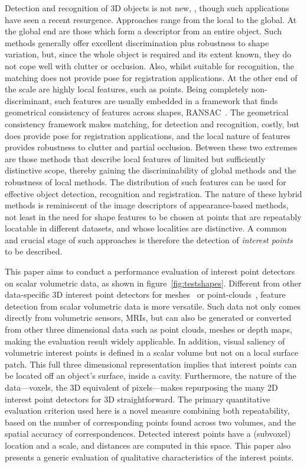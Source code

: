 Detection and recognition of 3D objects is not new, \eg \cite{Fisher1987}, though such applications have seen a recent resurgence. Approaches range from the local to the global. 
At the global end are those which form a descriptor from an entire object. Such methods generally offer excellent discrimination plus robustness to shape variation, but, since the whole object is required and its extent known, they do not cope well with clutter or occlusion. Also, whilst suitable for recognition, the matching does not provide pose for registration applications. At the other end of the scale are highly local features, such as points. Being completely non-discriminant, such features are usually embedded in a framework that finds geometrical consistency of features across shapes, \eg RANSAC~\cite{Brown2005,Papazov2011}. The geometrical consistency framework makes matching, for detection and recognition, costly, but does provide pose for registration applications, and the local nature of features provides robustness to clutter and partial occlusion. Between these two extremes are those methods that describe local features of limited but sufficiently distinctive scope, thereby gaining the discriminability of global methods and the robustness of local methods. The distribution of such features can be used for effective object detection, recognition and registration. The nature of these hybrid methods is reminiscent of the image descriptors of appearance-based methods, not least in the need for shape features to be chosen at points that are repeatably locatable in different datasets, and whose localities are distinctive. A common and crucial stage of such approaches is therefore the detection of \emph{interest points} to be described. 


This paper aims to conduct a performance evaluation of interest point detectors on scalar volumetric data, as shown in figure~\ref{fig:testshapes}. 
Different from other data-specific 3D interest point detectors for meshes~\cite{Sipiran2011,Glomb2009,Zaharescu2009} or point-clouds~\cite{Aanaes2012,Unnikrishnan2008}, feature detection from scalar volumetric data is more versatile. Such data not only comes directly from volumetric sensors, \eg MRIs, but can also be generated or converted from other three dimensional data such as point clouds, meshes or depth maps, making the evaluation result widely applicable.
In addition, visual saliency of volumetric interest points is defined in a scalar volume but not on a local surface patch. This full three dimensional representation implies that interest points can be located off an object's surface, \eg inside a cavity.
Furthermore, the nature of the data---voxels, the 3D equivalent of pixels---makes repurposing the many 2D interest point detectors for 3D straightforward. The primary quantitative evaluation criterion used here is a novel measure combining both repeatability, based on the number of corresponding points found across two volumes, and the spatial accuracy of correspondences. Detected interest points have a (subvoxel) location and a scale, and distances are computed in this space. This paper also presents a generic evaluation of qualitative characteristics of the interest points.

